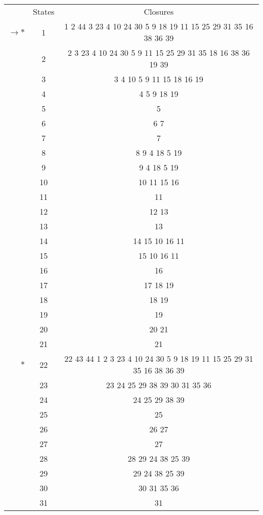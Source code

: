 \begin{tabular}[c]{r|c|c|} \cline{2-3}
    & States & Closures \\ \cline{2-3}
    $\rightarrow *$ & 1 & 1 2 44 3 23 4 10 24 30 5 9 18 19 11 15 25 29 31 35 16 38 36 39 \\ \cline{2-3}
    & 2 & 2 3 23 4 10 24 30 5 9 11 15 25 29 31 35 18 16 38 36 19 39 \\ \cline{2-3}
    & 3 & 3 4 10 5 9 11 15 18 16 19 \\ \cline{2-3}
    & 4 & 4 5 9 18 19 \\ \cline{2-3}
    & 5 & 5 \\ \cline{2-3}
    & 6 & 6 7 \\ \cline{2-3}
    & 7 & 7 \\ \cline{2-3}
    & 8 & 8 9 4 18 5 19 \\ \cline{2-3}
    & 9 & 9 4 18 5 19 \\ \cline{2-3}
    & 10 & 10 11 15 16 \\ \cline{2-3}
    & 11 & 11 \\ \cline{2-3}
    & 12 & 12 13 \\ \cline{2-3}
    & 13 & 13 \\ \cline{2-3}
    & 14 & 14 15 10 16 11 \\ \cline{2-3}
    & 15 & 15 10 16 11 \\ \cline{2-3}
    & 16 & 16 \\ \cline{2-3}
    & 17 & 17 18 19 \\ \cline{2-3}
    & 18 & 18 19 \\ \cline{2-3}
    & 19 & 19 \\ \cline{2-3}
    & 20 & 20 21 \\ \cline{2-3}
    & 21 & 21 \\ \cline{2-3}
    $*$ & 22 & 22 43 44 1 2 3 23 4 10 24 30 5 9 18 19 11 15 25 29 31 35 16 38 36 39 \\ \cline{2-3}
    & 23 & 23 24 25 29 38 39 30 31 35 36 \\ \cline{2-3}
    & 24 & 24 25 29 38 39 \\ \cline{2-3}
    & 25 & 25 \\ \cline{2-3}
    & 26 & 26 27 \\ \cline{2-3}
    & 27 & 27 \\ \cline{2-3}
    & 28 & 28 29 24 38 25 39 \\ \cline{2-3}
    & 29 & 29 24 38 25 39 \\ \cline{2-3}
    & 30 & 30 31 35 36 \\ \cline{2-3}
    & 31 & 31 \\ \cline{2-3}

\end{tabular}
